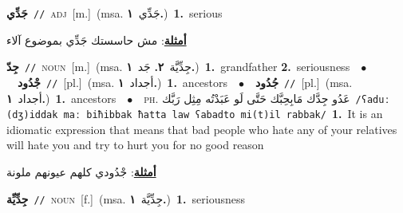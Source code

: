 \documentclass[10pt,a4paper,twoside]{article} %
\begin{document}
\begin{multicols}{2}
{\setlength\topsep{0pt}\textbf{\foreignlanguage{arabic}{جَدِّي}}\ {\color{gray}\texttt{//}\color{black}}\ \textsc{adj}\ [m.]\ \color{gray}(msa. \foreignlanguage{arabic}{جَدِّي}~\foreignlanguage{arabic}{\textbf{١.}})\color{black}\ \textbf{1.}~serious\  \begin{flushright}\color{gray}\foreignlanguage{arabic}{\textbf{\underline{\foreignlanguage{arabic}{أمثلة}}}: مش حاسستك جَدِّي بموضوع آلاء}\end{flushright}\color{black}} \vspace{2mm}

{\setlength\topsep{0pt}\textbf{\foreignlanguage{arabic}{جِدّ}}\ {\color{gray}\texttt{//}\color{black}}\ \textsc{noun}\ [m.]\ \color{gray}(msa. \foreignlanguage{arabic}{جِدِّيَّة}~\foreignlanguage{arabic}{\textbf{٢.}}  \foreignlanguage{arabic}{جَد}~\foreignlanguage{arabic}{\textbf{١.}})\color{black}\ \textbf{1.}~grandfather  \textbf{2.}~seriousness\ \ $\bullet$\ \ \setlength\topsep{0pt}\textbf{\foreignlanguage{arabic}{جْدُود}}\ {\color{gray}\texttt{//}\color{black}}\ [pl.]\ \color{gray}(msa. \foreignlanguage{arabic}{أجداد}~\foreignlanguage{arabic}{\textbf{١.}})\color{black}\ \textbf{1.}~ancestors\ \ $\bullet$\ \ \setlength\topsep{0pt}\textbf{\foreignlanguage{arabic}{جُدُود}}\ {\color{gray}\texttt{//}\color{black}}\ [pl.]\ \color{gray}(msa. \foreignlanguage{arabic}{أجداد}~\foreignlanguage{arabic}{\textbf{١.}})\color{black}\ \textbf{1.}~ancestors\ \ $\bullet$\ \ \textsc{ph.} \color{gray} \foreignlanguage{arabic}{عَدُو جِدَّك مَابِحِبَّك حَتَّى لَو عَبَدْتُه مِثِل رَبَّك}\color{black}\ {\color{gray}\texttt{/{\sffamily ʕaduː (dʒ)iddak maː biħibbak ħatta law ʕabadto mi(t)il rabbak}/}\color{black}}\ \textbf{1.}~It is an idiomatic expression that means that bad people who hate any of your relatives will hate you and try to hurt you for no good reason\  \begin{flushright}\color{gray}\foreignlanguage{arabic}{\textbf{\underline{\foreignlanguage{arabic}{أمثلة}}}: جْدُودي كلهم عيونهم ملونة}\end{flushright}\color{black}} \vspace{2mm}

{\setlength\topsep{0pt}\textbf{\foreignlanguage{arabic}{جِدِّيِّة}}\ {\color{gray}\texttt{//}\color{black}}\ \textsc{noun}\ [f.]\ \color{gray}(msa. \foreignlanguage{arabic}{جِدِّيَّة}~\foreignlanguage{arabic}{\textbf{١.}})\color{black}\ \textbf{1.}~seriousness\ } \vspace{2mm}


\end{multicols}
\end{document}
